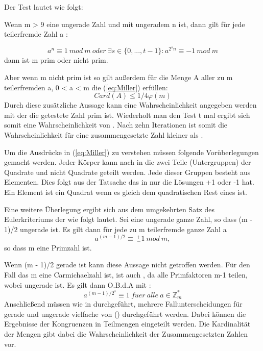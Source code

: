 		 Der Test lautet wie folgt:
		 
		 Wenn m \myin {} > 9  eine ungerade Zahl und  mit ungeradem n ist, dann gilt für jede teilerfremde Zahl a \myin {}:
		 
	 	\begin{equation} \label{eq:Miller}
			a^n \equiv 1~mod~m~oder~\exists s \in \{0,..., t - 1\} : a^{2^sn} \equiv -1~mod~m
		\end{equation}
		dann ist m prim oder nicht prim.
		
		Aber wenn m nicht prim ist so gilt außerdem für die Menge A aller zu m teilerfremden a, 0 < a < m die (\ref{eq:Miller}) erfüllen:
	 	\begin{displaymath}
		 	Card(A) \leq 1/4 \varphi(m)
	 	\end{displaymath}
	 	Durch diese zusätzliche Aussage kann eine Wahrscheinlichkeit angegeben werden mit der die getestete Zahl prim ist. Wiederholt man den Test t mal ergibt sich somit eine Wahrscheinlichkeit von . Nach zehn Iterationen ist somit die Wahrscheinlichkeit für eine zusammengesetzte Zahl kleiner als .
	 	
	 	Um die Ausdrücke in (\ref{eq:Miller}) zu verstehen müssen folgende Vorüberlegungen gemacht werden.
	 	Jeder Körper  kann nach \cite{Algorithmische:Zahlentheorie} in die zwei Teile (Untergruppen) der Quadrate und nicht Quadrate geteilt werden. Jede dieser Gruppen besteht aus  Elementen. Dies folgt aus der Tatsache das  in  nur die Lösungen +1 oder -1 hat. Ein Element ist ein Quadrat wenn es gleich dem quadratischen Rest eines  ist.
	 	
	 	Eine weitere Überlegung ergibt sich aus dem umgekehrten Satz des Eulerkriteriums der wie folgt lautet.
	 	Sei  eine ungerade ganze Zahl, so dass (m - 1)/2 ungerade ist.
	 	Es gilt dann für jede zu m teilerfremde ganze Zahl a
	 	\begin{displaymath}
		 	a^{(m-1)/2} \equiv~^+_-1~mod~m,
	 	\end{displaymath}
	 	so dass m eine Primzahl ist.
	 	
	 	Wenn (m - 1)/2 gerade ist kann diese Aussage nicht getroffen werden. Für den Fall das m eine Carmichaelzahl ist, ist auch  , da alle Primfaktoren m-1 teilen, wobei  ungerade ist. Es gilt dann O.B.d.A mit :
 		\begin{displaymath}
	 		a^{(m-1)/2^s} \equiv1 ~fuer~alle~a \in \mathbb{Z}^*_m
 		\end{displaymath}
 		Anschließend müssen wie in \cite{Algorithmische:Zahlentheorie} durchgeführt, mehrere Fallunterscheidungen für gerade und ungerade vielfache von () durchgeführt werden. Dabei können die Ergebnisse der Kongruenzen in Teilmengen eingeteilt werden. Die Kardinalität der Mengen gibt dabei die Wahrscheinlichkeit der Zusammengesetzten Zahlen vor.
 		
